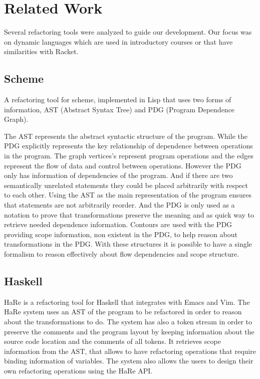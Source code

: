 \section{Related Work}
\label{sec:Related-Work}
Several refactoring tools were analyzed to guide our development.
Our focus was on dynamic languages which are used in introductory courses or that have similarities
with Racket.

\subsection{Scheme}
A refactoring tool \cite{griswold1991program} for scheme, implemented in Lisp that
uses two forms of information, AST (Abstract Syntax Tree) and PDG (Program Dependence Graph).

The AST represents the abstract syntactic structure of the program.
While the PDG explicitly represents the key relationship of dependence between
operations in the program. %
The graph vertices's represent program operations and the edges represent the flow of
data and control between operations.
However the PDG only has information of dependencies of the program. And if there
are two semantically unrelated statements they could be placed arbitrarily with
respect to each other.
Using the AST as the main representation of the program ensures that statements
are not arbitrarily reorder.
And the PDG is only used as a notation to prove that transformations preserve
the meaning and as quick way to retrieve needed dependence information.
Contours are used with the PDG providing scope information, non existent in the PDG,
to help reason about transformations in the PDG.
With these structures it is possible to have a single formalism to reason effectively
about flow dependencies and scope structure.
\subsection{Haskell}
HaRe \cite{thompson2005refactoring} is a refactoring tool for Haskell that
integrates with Emacs and Vim.
The HaRe system uses an AST of the program to be
refactored in order to reason about the transformations to do.
The system has also a token stream in order to preserve the comments and the
program layout by keeping information about the source code location and the comments of all tokens.
It retrieves scope information from the AST, that allows to have refactoring operations that
require binding information of variables. %
The system also allows the users to design their own refactoring operations
using the HaRe API.
